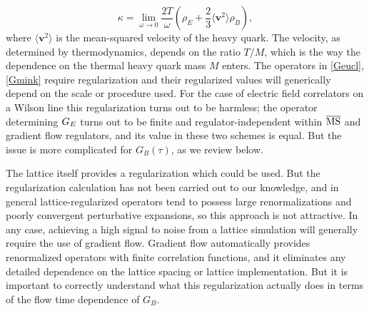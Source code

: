 \documentclass[floatfix,twocolumn,prd,showpacs,preprintnumbers,amsmath,nofootinbib,amssymb,superscriptaddress]{revtex4-2}
\begin{document}
\begin{equation}
\label{kappa}
    \kappa = \lim_{\omega \to 0} \frac{2T}{\omega}
    \left( \rho_E + \frac{2}{3} \langle \mathbf{v}^2 \rangle \rho_B \right),
\end{equation}
where $\langle \mathbf{v}^2 \rangle$ is the mean-squared velocity of the heavy quark. The velocity, as determined by thermodynamics, depends on the ratio $T/M$, which is the way the dependence on the thermal heavy quark mass $M$ enters.
The operators in \cref{Geucl}, \cref{Gmink} require regularization and their regularized values will generically depend on the scale or procedure used.
For the case of electric field correlators on a Wilson line this regularization turns out to be harmless;
the operator determining $G_E$ turns out to be finite and regulator-independent within $\overline{\text{MS}}$ and gradient flow regulators, and its value in these two schemes is equal.
But the issue is more complicated for $G_B(\tau)$, as we review below.

The lattice itself provides a regularization which could be used.
But the regularization calculation has not been carried out to our knowledge, and in general lattice-regularized operators tend to possess large renormalizations and poorly convergent perturbative expansions, so this approach is not attractive.
In any case, achieving a high signal to noise from a lattice simulation will generally require the use of gradient flow.
Gradient flow automatically provides renormalized operators with finite correlation functions, and it eliminates any detailed dependence on the lattice spacing or lattice implementation.
But it is important to correctly understand what this regularization actually does in terms of the flow time dependence of $G_B$.
\end{document}
